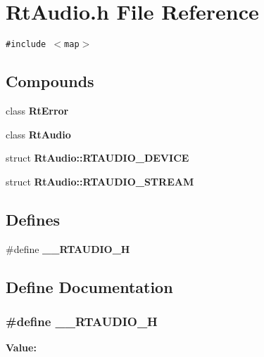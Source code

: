 \section{Rt\-Audio.h File Reference}
\label{RtAudio_8h}
{\tt \#include $<$map$>$}\par
\subsection*{Compounds}
\begin{CompactItemize}
\item 
class {\bf Rt\-Error}
\item 
class {\bf Rt\-Audio}
\item 
struct {\bf Rt\-Audio::RTAUDIO\_\-DEVICE}
\item 
struct {\bf Rt\-Audio::RTAUDIO\_\-STREAM}
\end{CompactItemize}
\subsection*{Defines}
\begin{CompactItemize}
\item 
\#define {\bf \_\-\_\-RTAUDIO\_\-H}
\end{CompactItemize}


\subsection{Define Documentation}
\subsubsection{\setlength{\rightskip}{0pt plus 5cm}\#define \_\-\_\-RTAUDIO\_\-H}\label{RtAudio_8h_a0}


{\bf Value:}\footnotesize\begin{verbatim}
\end{verbatim}\normalsize 
